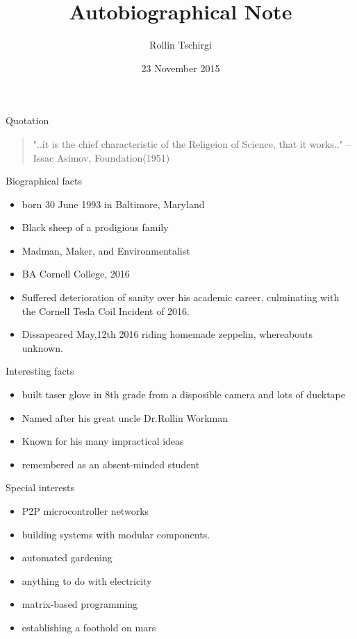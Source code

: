 \documentclass{beamer}
\title{Autobiographical Note}
\author{Rollin Tschirgi}
\institute{Cornell College}
\date{23 November 2015}
\begin{document}
\begin{frame}
  \titlepage
\end{frame}

\begin{frame}{Quotation}
\begin{quotation}
\noindent
"..it is the chief characteristic of the Religeion of Science, that it works.."
  \flushright
  --Issac Asimov, Foundation(1951)
  \end{quotation}
\end{frame}

\begin{frame}{Biographical facts}
\begin{itemize}
  \item born 30 June 1993 in Baltimore, Maryland
  \item Black sheep of a prodigious family
  \item Madman, Maker, and Environmentalist
  \item BA Cornell College, 2016
  \item Suffered deterioration of sanity over his academic career, culminating with the Cornell Tesla Coil Incident of 2016.
  \item Dissapeared May,12th 2016 riding homemade zeppelin, whereabouts unknown.
  \end{itemize}
\end{frame}

\begin{frame}{Interesting facts}
\begin{itemize}
  \item built taser glove in 8th grade from a disposible camera and lots of ducktape
  \item Named after his great uncle Dr.Rollin Workman
  \item Known for his many impractical ideas
  \item remembered as an absent-minded student
  \end{itemize}
\end{frame}

\begin{frame}{Special interests}

\begin{itemize}
  \item P2P microcontroller networks
  \item building systems with modular components.
  \item automated gardening
  \item anything to do with electricity
  \item matrix-based programming
  \item establishing a foothold on mars
\end{itemize}
\end{frame}
\end{document}
